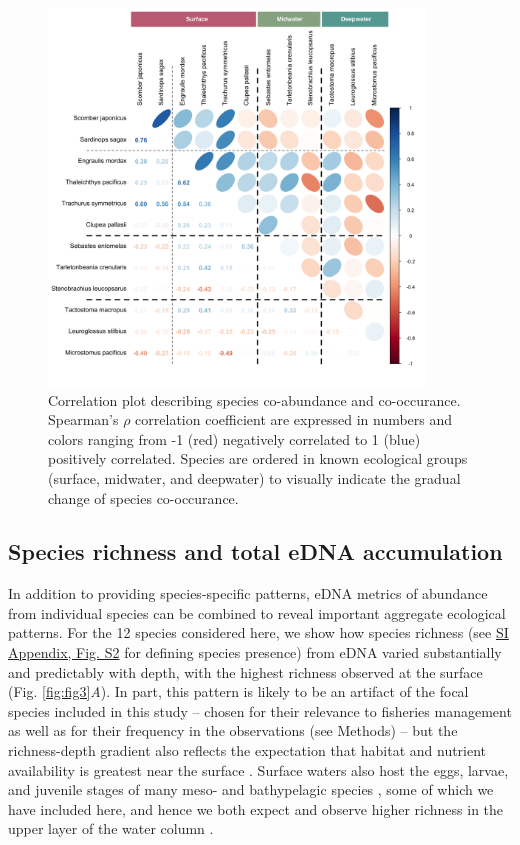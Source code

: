 \documentclass{article}
\begin{document}
\begin{figure}[tbhp] 
\centering
\includegraphics[width=10cm]{plots/2_Figure_2.jpg} 
\caption{Correlation plot describing species co-abundance and co-occurance. Spearman’s $\rho$ correlation coefficient are expressed in numbers and colors ranging from -1 (red) negatively correlated to 1 (blue) positively correlated. Species are ordered in known ecological groups (surface, midwater, and deepwater) to visually indicate the gradual change of species co-occurance.}
\label{fig:fig2}
\end{figure}

\subsection*{Species richness and total eDNA accumulation}
In addition to providing species-specific patterns, eDNA metrics of abundance from individual species can be combined to reveal important aggregate ecological patterns. For the 12 species considered here, we show how species richness (see \href{SI_Appendix.pdf}{SI Appendix, Fig. S2} for defining species presence) from eDNA varied substantially and predictably with depth, with the highest richness observed at the surface (Fig. \ref{fig:fig3}\textit{A}). In part, this pattern is likely to be an artifact of the focal species included in this study -- chosen for their relevance to fisheries management as well as for their frequency in the observations (see Methods) -- but the richness-depth gradient also reflects the expectation that habitat and nutrient availability is greatest near the surface \cite{smith2002,hickey2005}. Surface waters also host the eggs, larvae, and juvenile stages of many meso- and bathypelagic species \cite{parnel2008}, some of which we have included here, and hence we both expect and observe higher richness in the upper layer of the water column \cite{kim2011}.
\end{document}
